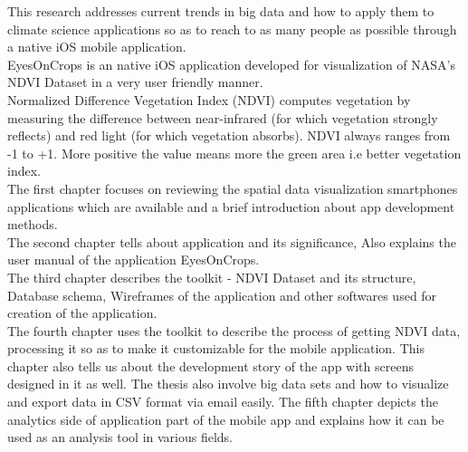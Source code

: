 
This research addresses current trends in big data and how to apply them to climate science applications so as to reach to as many people as possible through a native iOS mobile application. \\
EyesOnCrops is an native iOS application developed for visualization of NASA's NDVI Dataset in a very user friendly manner. \\
Normalized Difference Vegetation Index (NDVI) computes vegetation by measuring the difference between near-infrared (for which vegetation strongly reflects) and red light (for which vegetation absorbs). NDVI always ranges from -1 to +1. More positive the value means more the green area i.e better vegetation index. \\
The first chapter focuses on reviewing the spatial data visualization smartphones applications which are available and a brief introduction about app development methods. \\
The second chapter tells about application and its significance, Also explains the user manual of the application EyesOnCrops. \\
The third chapter describes the toolkit - NDVI Dataset and its structure, Database schema, Wireframes of the application and other softwares used for creation of the application. \\
The fourth chapter uses the toolkit to describe the process of getting NDVI data, processing it so as to make it customizable for the mobile application. This chapter also tells us about the development story of the app with screens designed in it as well. The thesis also involve big data sets and how to visualize and export data in CSV format via email easily.
The fifth chapter depicts the analytics side of application part of the mobile app and explains how it can be used as an analysis tool in various fields. \\



